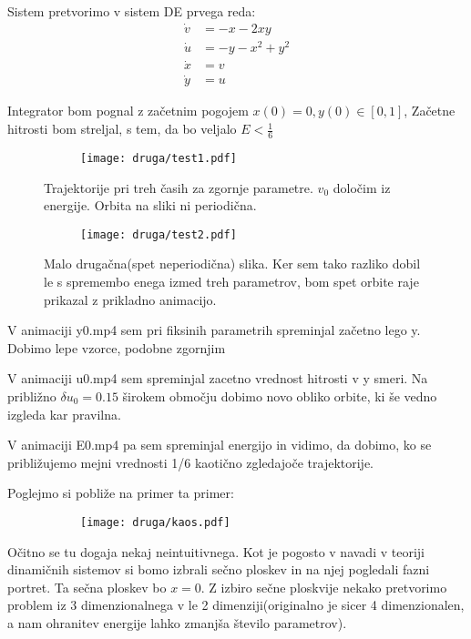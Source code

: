 \documentclass{article}
\begin{document}
Sistem pretvorimo v sistem DE prvega reda:
\begin{align*}
\dot{v} &= -x - 2xy\\
\dot{u} &= -y -x^2 + y^2\\
\dot{x} &= v \\
\dot{y} &= u
\end{align*}

Integrator bom pognal z začetnim pogojem $x(0)=0, y(0) \in [0,1]$, Začetne hitrosti bom streljal, s tem, da bo veljalo $E<\frac{1}{6}$

\begin{figure}[H]
\centering
\begin{subfigure}{\textwidth}
\texttt{[image: druga/test1.pdf]}
\end{subfigure}
\caption*{Trajektorije pri treh časih za zgornje parametre. $v_0$ določim iz energije. Orbita na sliki ni periodična.}
\end{figure}

\begin{figure}[H]
\centering
\begin{subfigure}{\textwidth}
\texttt{[image: druga/test2.pdf]}
\end{subfigure}
\caption*{Malo drugačna(spet neperiodična) slika. Ker sem tako razliko dobil le s spremembo enega izmed treh parametrov, bom spet orbite raje prikazal z prikladno animacijo.}
\end{figure}

V animaciji y0.mp4 sem pri fiksinih parametrih spreminjal začetno lego y. Dobimo lepe vzorce, podobne zgornjim


V animaciji u0.mp4 sem spreminjal zacetno vrednost hitrosti v y smeri. Na približno $\delta u_0 = 0.15$ širokem območju dobimo novo obliko orbite, ki še vedno izgleda kar pravilna.

V animaciji E0.mp4 pa sem spreminjal energijo in vidimo, da dobimo, ko se približujemo mejni vrednosti 1/6 kaotično zgledajoče trajektorije.

Poglejmo si pobliže na primer ta primer:
\begin{figure}[H]
\centering
\begin{subfigure}{\textwidth}
\texttt{[image: druga/kaos.pdf]}
\end{subfigure}
\end{figure}
Očitno se tu dogaja nekaj neintuitivnega. Kot je pogosto v navadi v teoriji dinamičnih sistemov si bomo izbrali sečno ploskev in na njej pogledali fazni portret. Ta sečna ploskev bo $x=0$. Z izbiro sečne ploskvije nekako pretvorimo problem iz 3 dimenzionalnega v le 2 dimenziji(originalno je sicer 4 dimenzionalen, a nam ohranitev energije lahko zmanjša število parametrov).
\end{document}

